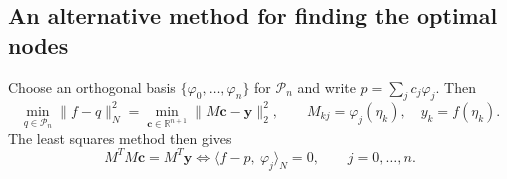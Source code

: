 \documentclass[11pt]{article}
\begin{document}
\subsection*{An alternative method for finding the optimal nodes}

Choose an orthogonal basis $\{\varphi_0,\dots,\varphi_n\}$ for $\mathcal{P}_n$ and write $p = \sum_{j} c_j\varphi_j$. Then
\[
\min_{q\in\mathcal{P}_n}\|f-q\|_N^2 = \min_{\mathbf{c}\in\mathbb{R}^{n+1}}\|M\mathbf{c}-\mathbf{y}\|_2^2, \qquad M_{kj} = \varphi_j(\eta_k), \quad y_k = f(\eta_k).
\]
The least squares method then gives
\[
M^TM\mathbf{c} = M^T\mathbf{y} \iff \langle f-p,\ \varphi_j\rangle_N = 0, \qquad j = 0,\dots,n.
\]
\end{document}
